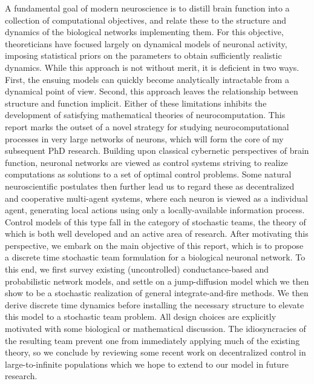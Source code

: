 \documentclass[12pt, oneside]{report}
\newcommand{\1}[1]{\mathbbm{1}_{\{#1\}}}
\theoremstyle{definition}
\begin{document}
A fundamental goal of modern neuroscience is to distill brain function into a
collection of computational objectives, and relate these to the structure and
dynamics of the biological networks implementing them. For this objective,
theoreticians have focused largely on dynamical models of neuronal activity,
imposing statistical priors on the parameters to obtain sufficiently realistic
dynamics. While this approach is not without merit, it is deficient in two ways.
First, the ensuing models can quickly become analytically intractable from a
dynamical point of view. Second, this approach leaves the relationship between
structure and function implicit. Either of these limitations inhibits the
development of satisfying mathematical theories of neurocomputation. This report marks the outset of a novel
strategy for studying neurocomputational processes in very large networks of
neurons, which will form the core of my subsequent PhD research. Building upon classical cybernetic perspectives of brain function,
neuronal networks are viewed as control systems striving to realize computations
as solutions to a set of optimal control problems. Some natural neuroscientific
postulates then further lead us to regard these as decentralized and cooperative
multi-agent systems, where each neuron is viewed as a individual agent,
generating local actions using only a locally-available information process. Control models
of this type fall in the category of stochastic teams, the theory of which is both well developed
and an active area of research. After motivating this perspective, we embark on the main objective of this report, which is to propose a discrete time stochastic team formulation for a biological neuronal network.
To this end, we first survey existing (uncontrolled) conductance-based and probabilistic network models,
and settle on a jump-diffusion model which we then show to be a stochastic realization of general integrate-and-fire methods. We then derive discrete time dynamics before
installing the necessary structure to elevate this model to a stochastic team problem. All design choices are explicitly motivated with some
biological or mathematical discussion. The idiosyncracies of the resulting team prevent one from immediately applying much of the existing theory,
so we conclude by reviewing some recent work on decentralized control in large-to-infinite populations which we hope to extend to
our model in future research.  
\newpage
\begin{center}
    \\[5pt]
\end{center}
\end{document}

